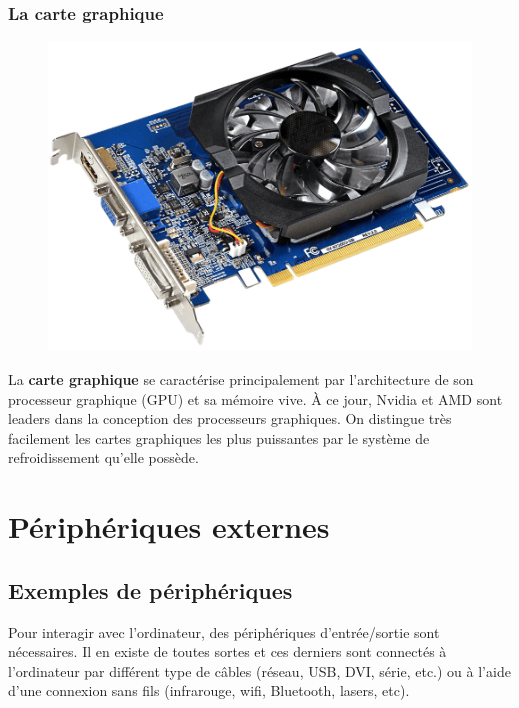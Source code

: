 \subsubsection{La carte graphique}
\begin{figure}
	\centering
	\includegraphics[scale=.2,trim=0 0 0 200]{Images/ordinateur/carte_graphique}
\end{figure}
La {\bf carte graphique} se caractérise principalement par l'architecture de son processeur graphique (GPU) et sa mémoire vive. À ce jour, Nvidia et AMD sont leaders dans la conception des processeurs graphiques. On distingue très facilement les cartes graphiques les plus puissantes par le système de refroidissement qu’elle possède.





\section{Périphériques externes}

\subsection{Exemples de périphériques}

Pour interagir avec l’ordinateur, des périphériques d’entrée/sortie sont nécessaires. Il en existe de toutes sortes et ces derniers sont connectés à l’ordinateur par différent type de câbles (réseau, USB, DVI, série, etc.) ou à l’aide d’une connexion sans fils (infrarouge, wifi, Bluetooth, lasers, etc).

